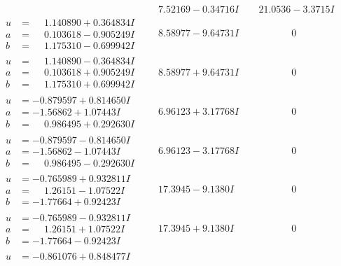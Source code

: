 \documentclass[1p]{elsarticle_modified}
\theoremstyle{definition}
\begin{document}
$$\begin{array}{c|c|c}
 & \phantom{-}7.52169 - 0.34716 I & \phantom{-}21.0536 - 3.3715 I \\ \hline\begin{aligned}
u &= \phantom{-}1.140890 + 0.364834 I \\
a &= \phantom{-}0.103618 - 0.905249 I \\
b &= \phantom{-}1.175310 - 0.699942 I\end{aligned}
 & \phantom{-}8.58977 - 9.64731 I & \phantom{-0.000000 } 0 \\ \hline\begin{aligned}
u &= \phantom{-}1.140890 - 0.364834 I \\
a &= \phantom{-}0.103618 + 0.905249 I \\
b &= \phantom{-}1.175310 + 0.699942 I\end{aligned}
 & \phantom{-}8.58977 + 9.64731 I & \phantom{-0.000000 } 0 \\ \hline\begin{aligned}
u &= -0.879597 + 0.814650 I \\
a &= -1.56862 + 1.07443 I \\
b &= \phantom{-}0.986495 + 0.292630 I\end{aligned}
 & \phantom{-}6.96123 + 3.17768 I & \phantom{-0.000000 } 0 \\ \hline\begin{aligned}
u &= -0.879597 - 0.814650 I \\
a &= -1.56862 - 1.07443 I \\
b &= \phantom{-}0.986495 - 0.292630 I\end{aligned}
 & \phantom{-}6.96123 - 3.17768 I & \phantom{-0.000000 } 0 \\ \hline\begin{aligned}
u &= -0.765989 + 0.932811 I \\
a &= \phantom{-}1.26151 - 1.07522 I \\
b &= -1.77664 + 0.92423 I\end{aligned}
 & \phantom{-}17.3945 - 9.1380 I & \phantom{-0.000000 } 0 \\ \hline\begin{aligned}
u &= -0.765989 - 0.932811 I \\
a &= \phantom{-}1.26151 + 1.07522 I \\
b &= -1.77664 - 0.92423 I\end{aligned}
 & \phantom{-}17.3945 + 9.1380 I & \phantom{-0.000000 } 0 \\ \hline\begin{aligned}
u &= -0.861076 + 0.848477 I \\

\end{aligned}
\end{array}$$
\end{document}
